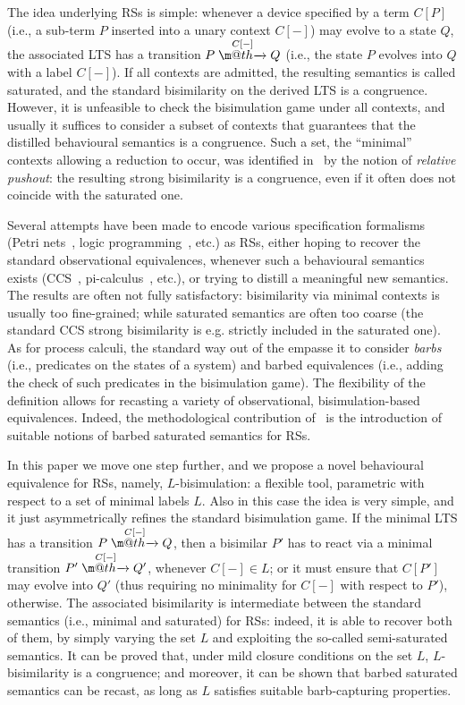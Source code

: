 \documentclass[copyright,creativecommons]{eptcs}
\makeatletter
\def\tr#1{\stackrel{#1}{\to}}
\let\oldrightarrow\to
\renewcommand{\to}[1][]{\ifthenelse{\equal{#1}{}}{\oldrightarrow}{\ensuremath{\xrightarrow{{}_{#1}}}}}
\def \rightarrowfill{\m@th\mathord{\smash-}\mkern-6mu\cleaders\hbox{$\mkern-2mu\mathord{\smash-}\mkern-2mu$}\hfill
  \mkern-6mu\mathord\rightarrow}
\def\tr#1{\stackrel{#1}{\rightarrowfill}}
\newcommand{\<}{\langle}
\renewcommand{\>}{\rangle}
\def\tr#1{\stackrel{#1}{\rightarrowfill}}
\def \rightarrowfill{\m@th\mathord{\smash-}\mkern-6mu\cleaders\hbox{$\mkern-2mu\mathord{\smash-}\mkern-2mu$}\hfill
  \mkern-6mu\mathord\rightarrow}
\makeatother
\begin{document}
The idea underlying RSs is simple: whenever a device specified by
a term $C[P]$ (i.e., a sub-term $P$ inserted into a unary context
$C[-]$) may evolve to a state $Q$, the associated LTS has a transition
$P \tr{C[-]} Q$ (i.e., the state $P$ evolves into $Q$ with a label
$C[-]$).
If all contexts are admitted, the resulting semantics is called
saturated, and the standard bisimilarity on the derived LTS is a
congruence.
However, it is unfeasible to check the bisimulation game under all
contexts, and usually it suffices to consider a subset of contexts
that guarantees that the distilled behavioural semantics is a
congruence.  Such a set, the ``minimal'' contexts allowing a reduction
to occur, was identified in~\cite{DBLP:conf/concur/LeiferM00} by the
notion of \emph{relative pushout}: the resulting strong bisimilarity
is a congruence, even if it often does not coincide with the saturated
one.

Several attempts have been made to encode various specification
formalisms (Petri nets~\cite{RobinBGPN,Sassone05}, logic
programming~\cite{LICS2006}, etc.) as RSs, either hoping to recover
the standard observational equivalences, whenever such a behavioural
semantics exists (CCS~\cite{MIL:CAC}, pi-calculus~\cite{Mil:PPCA},
etc.), or trying to distill a meaningful new semantics. The results
are often not fully satisfactory: bisimilarity via minimal contexts is
usually too fine-grained; while saturated semantics are often too
coarse (the standard CCS strong bisimilarity is e.g. strictly included
in the saturated one). As for process calculi, the standard way out of
the empasse it to consider \emph{barbs}~\cite{RobinICALP92} (i.e.,
predicates on the states of a system) and barbed equivalences
(i.e., adding the check of such predicates in the bisimulation game).
The flexibility
of the definition allows for recasting a variety of observational,
bisimulation-based equivalences. Indeed, the methodological
contribution of~\cite{BGMFOSSACS09} is the introduction of suitable
notions of barbed saturated semantics for RSs.

In this paper we move one step further, and we propose a novel
behavioural equivalence for RSs, namely, $L$-bisimulation: a
flexible tool, parametric with respect to a set of minimal labels $L$.
Also in this case the idea is very simple, and it just asymmetrically
refines the standard bisimulation game. If the minimal LTS has
a transition $P \tr{C[-]} Q$, then a bisimilar $P'$ has to react via
a minimal transition $P' \tr{C[-]} Q'$, whenever $C[-] \in L$;
or it must ensure that $C[P']$ may evolve into $Q'$ (thus requiring no
minimality for $C[-]$ with respect to $P'$), otherwise.
The associated bisimilarity is  intermediate between the standard semantics
(i.e., minimal and saturated)
for RSs: indeed, it is able to recover both of them, by simply
varying the set $L$ and exploiting the so-called semi-saturated semantics.
It can be proved that, under mild closure conditions on the set $L$,
$L$-bisimilarity is a congruence; and moreover, it can be shown
that  barbed saturated semantics can be recast, as long as $L$
satisfies suitable barb-capturing properties.
\end{document}

